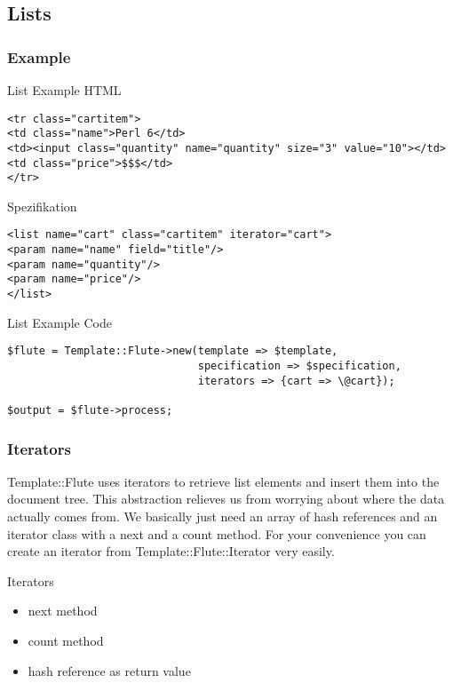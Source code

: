 \subsection{Lists}
\subsubsection{Example}
\begin{frame}[fragile]{List Example}
HTML
\begin{lstlisting}
<tr class="cartitem">
<td class="name">Perl 6</td>
<td><input class="quantity" name="quantity" size="3" value="10"></td>
<td class="price">$$$</td>
</tr>
\end{lstlisting}
Spezifikation
\begin{lstlisting}
<list name="cart" class="cartitem" iterator="cart">
<param name="name" field="title"/>
<param name="quantity"/>
<param name="price"/>
</list>
\end{lstlisting}
\end{frame}

\begin{frame}[fragile]{List Example}
Code
\begin{lstlisting}
$flute = Template::Flute->new(template => $template,
                              specification => $specification,
                              iterators => {cart => \@cart});

$output = $flute->process;
\end{lstlisting}
\end{frame}

\subsubsection{Iterators}
Template::Flute uses iterators to retrieve list elements and insert them into
the document tree. This abstraction relieves us from worrying about where
the data actually comes from. We basically just need an array of hash
references and an iterator class with a next and a count method. For your
convenience you can create an iterator from Template::Flute::Iterator
very easily.

\begin{frame}{Iterators}
\begin{itemize}
  \item next method
  \item count method
  \item hash reference as return value
 \end{itemize}
\end{frame}

